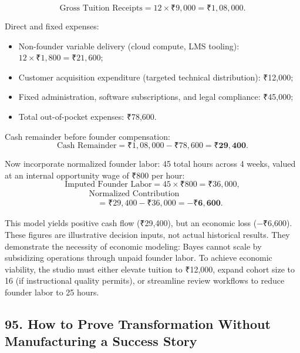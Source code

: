 \begin{equation}
\text{Gross Tuition Receipts} = 12 \times ₹9,000 = ₹1,08,000.
\end{equation}

Direct and fixed expenses:
\begin{itemize}
    \item Non-founder variable delivery (cloud compute, LMS tooling): $12 \times ₹1,800 = ₹21,600$;
    \item Customer acquisition expenditure (targeted technical distribution): ₹12,000;
    \item Fixed administration, software subscriptions, and legal compliance: ₹45,000;
    \item Total out-of-pocket expenses: ₹78,600.
\end{itemize}

Cash remainder before founder compensation:
\begin{equation}
\text{Cash Remainder} = ₹1,08,000 - ₹78,600 = \mathbf{₹29,400}.
\end{equation}

Now incorporate normalized founder labor: 45 total hours across 4 weeks, valued at an internal opportunity wage of ₹800 per hour:
\begin{equation}
\text{Imputed Founder Labor} = 45 \times ₹800 = ₹36,000,
\end{equation}
\begin{equation}
\begin{aligned}
&\text{Normalized Contribution} \\
&\quad = ₹29,400 - ₹36,000 = \mathbf{−₹6,600}.
\end{aligned}
\end{equation}

This model yields positive cash flow (₹29,400), but an economic loss (−₹6,600). These figures are illustrative decision inputs, not actual historical results. They demonstrate the necessity of economic modeling: Bayes cannot scale by subsidizing operations through unpaid founder labor. To achieve economic viability, the studio must either elevate tuition to ₹12,000, expand cohort size to 16 (if instructional quality permits), or streamline review workflows to reduce founder labor to 25 hours.

\subsection*{95. How to Prove Transformation Without Manufacturing a Success Story}

